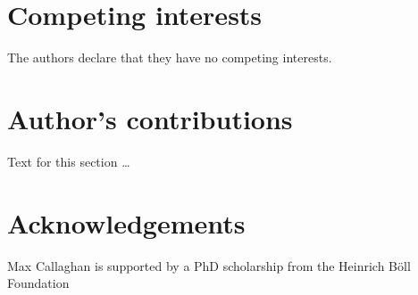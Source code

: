\documentclass{bmcart}
\begin{document}
\begin{backmatter}
	
	\section*{Competing interests}
	The authors declare that they have no competing interests.
	
	\section*{Author's contributions}
	Text for this section \ldots
	
	\section*{Acknowledgements}
	Max Callaghan is supported by a PhD scholarship from the Heinrich Böll Foundation
		
	
	
	
\end{backmatter}
\end{document}
